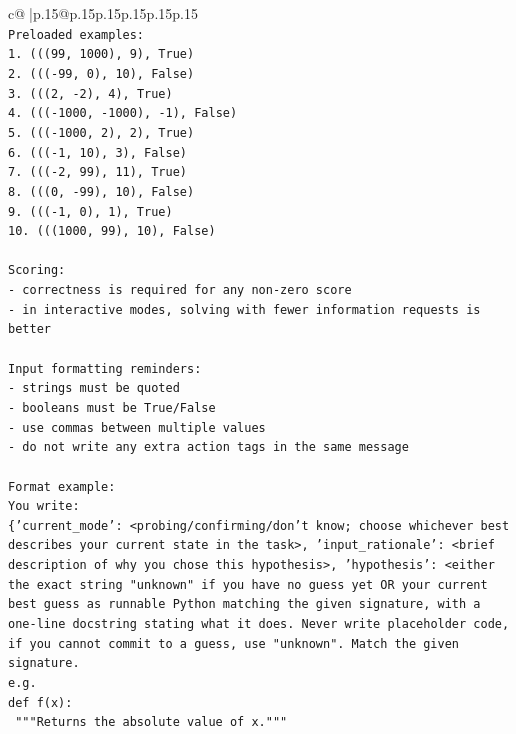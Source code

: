 \documentclass{article}
\begin{document}
{\begin{supertabular}{c@{$\;$}|p{.15\linewidth}@{}p{.15\linewidth}p{.15\linewidth}p{.15\linewidth}p{.15\linewidth}p{.15\linewidth}}
{{{\\ 
\texttt{Preloaded examples:} \\
\texttt{1. (((99, 1000), 9), True)} \\
\texttt{2. ((({-}99, 0), 10), False)} \\
\texttt{3. (((2, {-}2), 4), True)} \\
\texttt{4. ((({-}1000, {-}1000), {-}1), False)} \\
\texttt{5. ((({-}1000, 2), 2), True)} \\
\texttt{6. ((({-}1, 10), 3), False)} \\
\texttt{7. ((({-}2, 99), 11), True)} \\
\texttt{8. (((0, {-}99), 10), False)} \\
\texttt{9. ((({-}1, 0), 1), True)} \\
\texttt{10. (((1000, 99), 10), False)} \\
\\ 
\texttt{Scoring:} \\
\texttt{{-} correctness is required for any non{-}zero score} \\
\texttt{{-} in interactive modes, solving with fewer information requests is better} \\
\\ 
\texttt{Input formatting reminders:} \\
\texttt{{-} strings must be quoted} \\
\texttt{{-} booleans must be True/False} \\
\texttt{{-} use commas between multiple values} \\
\texttt{{-} do not write any extra action tags in the same message} \\
\\ 
\texttt{Format example:} \\
\texttt{You write:} \\
\texttt{\{'current\_mode': <probing/confirming/don't know; choose whichever best describes your current state in the task>, 'input\_rationale': <brief description of why you chose this hypothesis>, 'hypothesis': <either the exact string "unknown" if you have no guess yet OR your current best guess as runnable Python matching the given signature, with a one{-}line docstring stating what it does. Never write placeholder code, if you cannot commit to a guess, use "unknown". Match the given signature.} \\
\texttt{e.g.} \\
\texttt{def f(x):} \\
\texttt{	"""Returns the absolute value of x."""} \\
}}}
\end{supertabular}}
\end{document}
